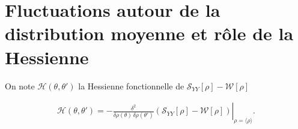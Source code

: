 %					
			

		
			

\section{Fluctuations autour de la distribution moyenne et rôle de la Hessienne}



On note \( \mathcal{H}(\theta, \theta') \)  la Hessienne fonctionnelle de  \( \mathcal{S}_{YY}[\rho] - \mathcal{W}[\rho] \)


\begin{eqnarray}
    \mathcal{H}(\theta, \theta') = - \left. \frac{\delta^2}{\delta \rho(\theta) \, \delta \rho(\theta')} \left( \mathcal{S}_{YY}[\rho] - \mathcal{W}[\rho] \right) \right|_{\rho = \langle \rho \rangle}.
\end{eqnarray}

